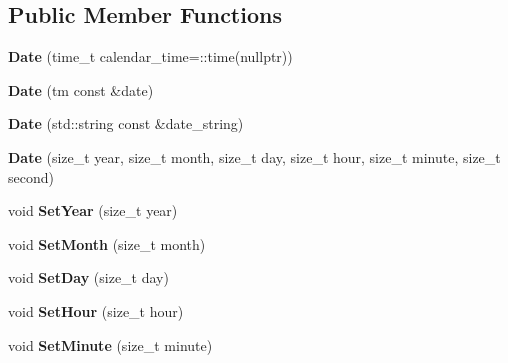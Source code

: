 \subsection*{Public Member Functions}
\begin{DoxyCompactItemize}
\item 
\hypertarget{classlsf_1_1util_1_1Date_a8749c399e029448fdfb2271ab2ff7fb7}{
{\bfseries Date} (time\_\-t calendar\_\-time=::time(nullptr))}
\label{classlsf_1_1util_1_1Date_a8749c399e029448fdfb2271ab2ff7fb7}

\item 
\hypertarget{classlsf_1_1util_1_1Date_a16e5acfbc8245df878581e13442d0acd}{
{\bfseries Date} (tm const \&date)}
\label{classlsf_1_1util_1_1Date_a16e5acfbc8245df878581e13442d0acd}

\item 
\hypertarget{classlsf_1_1util_1_1Date_a535d986e7abeac184657db7225857564}{
{\bfseries Date} (std::string const \&date\_\-string)}
\label{classlsf_1_1util_1_1Date_a535d986e7abeac184657db7225857564}

\item 
\hypertarget{classlsf_1_1util_1_1Date_a0c6a48c6e4251beefa543c1f1563cb36}{
{\bfseries Date} (size\_\-t year, size\_\-t month, size\_\-t day, size\_\-t hour, size\_\-t minute, size\_\-t second)}
\label{classlsf_1_1util_1_1Date_a0c6a48c6e4251beefa543c1f1563cb36}

\item 
\hypertarget{classlsf_1_1util_1_1Date_a710255e5d9454724e453b4cdea9b054b}{
void {\bfseries SetYear} (size\_\-t year)}
\label{classlsf_1_1util_1_1Date_a710255e5d9454724e453b4cdea9b054b}

\item 
\hypertarget{classlsf_1_1util_1_1Date_a478d491daf729b27b6b670510991259e}{
void {\bfseries SetMonth} (size\_\-t month)}
\label{classlsf_1_1util_1_1Date_a478d491daf729b27b6b670510991259e}

\item 
\hypertarget{classlsf_1_1util_1_1Date_a4ad5d492c50818ffd860ed5dae2ac662}{
void {\bfseries SetDay} (size\_\-t day)}
\label{classlsf_1_1util_1_1Date_a4ad5d492c50818ffd860ed5dae2ac662}

\item 
\hypertarget{classlsf_1_1util_1_1Date_a5b4c9b5db986e3c4883343f4788d7904}{
void {\bfseries SetHour} (size\_\-t hour)}
\label{classlsf_1_1util_1_1Date_a5b4c9b5db986e3c4883343f4788d7904}

\item 
\hypertarget{classlsf_1_1util_1_1Date_a81d750606ce226a6788cbd711ad62f12}{
void {\bfseries SetMinute} (size\_\-t minute)}
\label{classlsf_1_1util_1_1Date_a81d750606ce226a6788cbd711ad62f12}


\end{DoxyCompactItemize}
